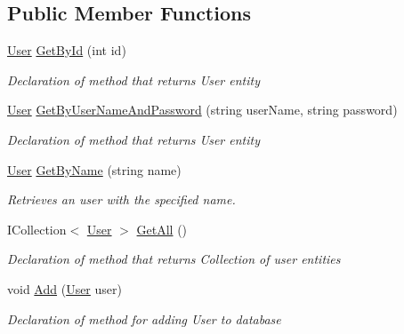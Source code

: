 \subsection*{Public Member Functions}
\begin{DoxyCompactItemize}
\item 
\mbox{\hyperlink{class_gielda_l2_1_1_d_b_1_1_entities_1_1_user}{User}} \mbox{\hyperlink{interface_gielda_l2_1_1_d_b_1_1_interfaces_1_1_i_user_repository_ae3b2e6d986054c6b336887b4d0d1cfac}{Get\+By\+Id}} (int id)
\begin{DoxyCompactList}\small\item\em Declaration of method that returns User entity \end{DoxyCompactList}\item 
\mbox{\hyperlink{class_gielda_l2_1_1_d_b_1_1_entities_1_1_user}{User}} \mbox{\hyperlink{interface_gielda_l2_1_1_d_b_1_1_interfaces_1_1_i_user_repository_a8a8920b50795c07316baf914e70f5ee3}{Get\+By\+User\+Name\+And\+Password}} (string user\+Name, string password)
\begin{DoxyCompactList}\small\item\em Declaration of method that returns User entity \end{DoxyCompactList}\item 
\mbox{\hyperlink{class_gielda_l2_1_1_d_b_1_1_entities_1_1_user}{User}} \mbox{\hyperlink{interface_gielda_l2_1_1_d_b_1_1_interfaces_1_1_i_user_repository_a6bcf2b383638bfded753b394d1f4de0b}{Get\+By\+Name}} (string name)
\begin{DoxyCompactList}\small\item\em Retrieves an user with the specified name. \end{DoxyCompactList}\item 
I\+Collection$<$ \mbox{\hyperlink{class_gielda_l2_1_1_d_b_1_1_entities_1_1_user}{User}} $>$ \mbox{\hyperlink{interface_gielda_l2_1_1_d_b_1_1_interfaces_1_1_i_user_repository_ada0fb28a6665ffc0191086563dbeb28e}{Get\+All}} ()
\begin{DoxyCompactList}\small\item\em Declaration of method that returns Collection of user entities \end{DoxyCompactList}\item 
void \mbox{\hyperlink{interface_gielda_l2_1_1_d_b_1_1_interfaces_1_1_i_user_repository_afd1f24172cd7dd824feb7d1d67ff9475}{Add}} (\mbox{\hyperlink{class_gielda_l2_1_1_d_b_1_1_entities_1_1_user}{User}} user)
\begin{DoxyCompactList}\small\item\em Declaration of method for adding User to database \end{DoxyCompactList}\item 

\end{DoxyCompactItemize}
